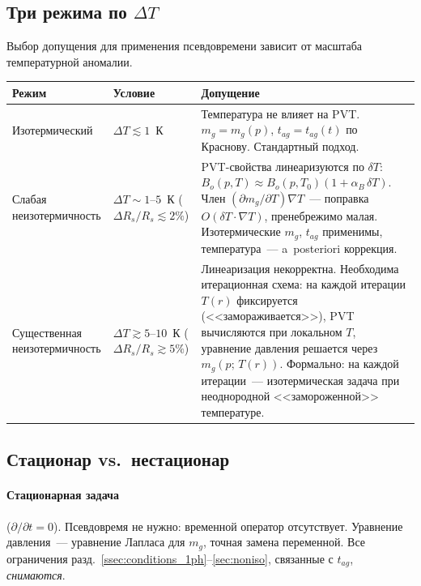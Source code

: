 \documentclass[12pt,a4paper]{article}
\begin{document}
\subsection{Три режима по $\Delta T$}

Выбор допущения для применения псевдовремени зависит
от масштаба температурной аномалии.

\begin{center}
\renewcommand{\arraystretch}{1.3}
\begin{tabular}{p{}p{}p{}}
\hline
\textbf{Режим} & \textbf{Условие} & \textbf{Допущение} \\
\hline
Изотермический
& $\Delta T \lesssim 1$~К
& Температура не влияет на PVT.
  $m_g = m_g(p)$, $t_{ag} = t_{ag}(t)$ по Краснову.
  Стандартный подход. \\

Слабая неизотер\-мичность
& $\Delta T \sim 1$--$5$~К ($\Delta R_s/R_s \lesssim 2\%$)
& PVT-свойства линеаризуются по $\delta T$:
  $B_o(p,T) \approx B_o(p,T_0)(1+\alpha_B\,\delta T)$.
  Член $(\partial m_g/\partial T)\nabla T$~---
  поправка $O(\delta T \cdot \nabla T)$,
  пренебрежимо малая.
  Изотермические $m_g$, $t_{ag}$ применимы,
  температура~--- a~posteriori коррекция. \\

Существенная неизотер\-мичность
& $\Delta T \gtrsim 5$--$10$~К ($\Delta R_s/R_s \gtrsim 5\%$)
& Линеаризация некорректна.
  Необходима итерационная схема:
  на каждой итерации $T(r)$ фиксируется (<<замораживается>>),
  PVT вычисляются при локальном $T$, уравнение давления
  решается через $m_g(p;\,T(r))$.
  Формально: на каждой итерации~---
  изотермическая задача при неоднородной
  <<замороженной>> температуре. \\
\hline
\end{tabular}
\end{center}

\subsection{Стационар vs.\ нестационар}

\paragraph{Стационарная задача} ($\partial/\partial t = 0$).
Псевдовремя не нужно: временной оператор отсутствует.
Уравнение давления~--- уравнение Лапласа для $m_g$,
точная замена переменной. Все ограничения
разд.~\ref{ssec:conditions_1ph}--\ref{sec:noniso},
связанные с $t_{ag}$, \emph{снимаются}.
\end{document}
